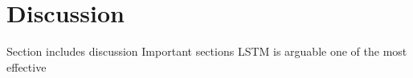 \section{Discussion}
Section includes discussion
Important sections
LSTM is arguable one of the most effective